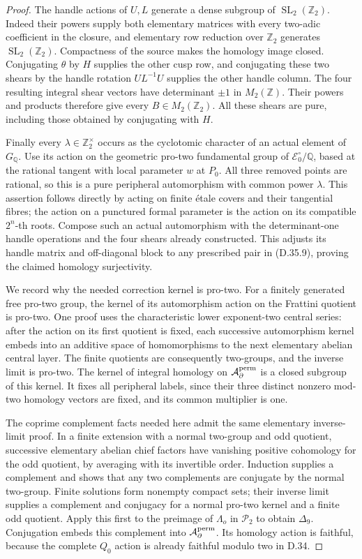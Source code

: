 \begin{proof}
The handle actions of $U,L$ generate a dense subgroup of
$\operatorname{SL}_2(\mathbb Z_2)$. Indeed their powers supply both
elementary matrices with every two-adic coefficient in the closure,
and elementary row reduction over $\mathbb Z_2$ generates
$\operatorname{SL}_2(\mathbb Z_2)$. Compactness of the source makes
the homology image closed. Conjugating $\theta$ by $H$ supplies the
other cusp row, and conjugating these two shears by the handle rotation
$UL^{-1}U$ supplies the other handle column. The four resulting
integral shear vectors have determinant $\pm1$ in $M_2(\mathbb Z)$.
Their powers and products therefore give every $B\in M_2(\mathbb Z_2)$.
All these shears are pure, including those obtained by conjugating
with $H$.

Finally every $\lambda\in\mathbb Z_2^\times$ occurs as the
cyclotomic character of an actual element of $G_{\mathbb Q}$.
Use its action on the geometric pro-two fundamental group of
$\mathcal E_0^\circ/\mathbb Q$, based at the rational tangent with
local parameter $w$ at $P_0$. All three removed points are rational,
so this is a pure peripheral automorphism with common power
$\lambda$. This assertion follows directly by acting on finite
\'etale covers and their tangential fibres; the action on a punctured
formal parameter is the action on its compatible $2^n$-th roots.
Compose such an actual automorphism with the determinant-one handle
operations and the four shears already constructed. This adjusts its
handle matrix and off-diagonal block to any prescribed pair in
(D.35.9), proving the claimed homology surjectivity.

We record why the needed correction kernel is pro-two. For a finitely
generated free pro-two group, the kernel of its automorphism action
on the Frattini quotient is pro-two. One proof uses the characteristic
lower exponent-two central series: after the action on its first
quotient is fixed, each successive automorphism kernel embeds into
an additive space of homomorphisms to the next elementary abelian
central layer. The finite quotients are consequently two-groups,
and the inverse limit is pro-two. The kernel of integral homology
on $\mathcal A_{\partial}^{\rm perm}$ is a closed subgroup of this
kernel. It fixes all peripheral labels, since their three distinct
nonzero mod-two homology vectors are fixed, and its common multiplier
is one.

The coprime complement facts needed here admit the same elementary
inverse-limit proof. In a finite extension with a normal two-group
and odd quotient, successive elementary abelian chief factors have
vanishing positive cohomology for the odd quotient, by averaging
with its invertible order. Induction supplies a complement and shows
that any two complements are conjugate by the normal two-group.
Finite solutions form nonempty compact sets; their inverse limit
supplies a complement and conjugacy for a normal pro-two kernel and
a finite odd quotient. Apply this first to the preimage of
$\Lambda_o$ in $\mathcal P_2$ to obtain $\Delta_9$. Conjugation
embeds this complement into $\mathcal A_{\partial}^{\rm perm}$.
Its homology action is faithful, because the complete $Q_0$ action
is already faithful modulo two in D.34.


\end{proof}
